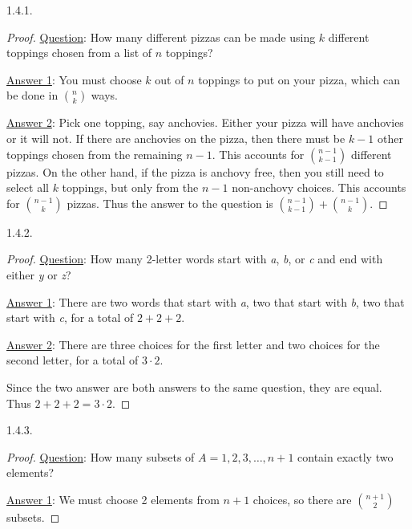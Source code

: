  \protect {} \protect \begin {itemize} 
\begin{ans}{1.4.1.}
		\begin{proof}
			\underline{Question}: How many different pizzas can be made using $k$ different toppings chosen from a list of $n$ toppings?

			\underline{Answer 1}: You must choose $k$ out of $n$ toppings to put on your pizza, which can be done in ${n \choose k}$ ways.

			\underline{Answer 2}: Pick one topping, say anchovies.  Either your pizza will have anchovies or it will not.  If there are anchovies on the pizza, then there must be $k-1$ other toppings chosen from the remaining $n-1$.  This accounts for ${n-1 \choose k-1}$ different pizzas.  On the other hand, if the pizza is anchovy free, then you still need to select all $k$ toppings, but only from the $n-1$ non-anchovy choices.  This accounts for ${n-1 \choose k}$ pizzas.  Thus the answer to the question is ${n-1 \choose k-1} + {n-1 \choose k}$.
		\end{proof}
	
\end{ans}
\begin{ans}{1.4.2.}
		\begin{proof}
		\underline{Question}: How many 2-letter words start with \textit{a}, \textit{b}, or \textit{c} and end with either \textit{y} or \textit{z}?

		\underline{Answer 1}: There are two words that start with \textit{a}, two that start with \textit{b}, two that start with \textit{c}, for a total of $2+2+2$.

		\underline{Answer 2}:  There are three choices for the first letter and two choices for the second letter, for a total of $3 \cdot 2$.

		Since the two answer are both answers to the same question, they are equal.  Thus $2 + 2 + 2 = 3\cdot 2$.
		\end{proof}
	
\end{ans}
\begin{ans}{1.4.3.}
	\begin{proof}
        \underline{Question}: How many subsets of $A = {1,2,3, \ldots, n+1}$ contain exactly two elements?

        \underline{Answer 1}: We must choose 2 elements from $n+1$ choices, so there are ${n+1 \choose 2}$ subsets.


\end{proof}
\end{ans}
\end{itemize}
